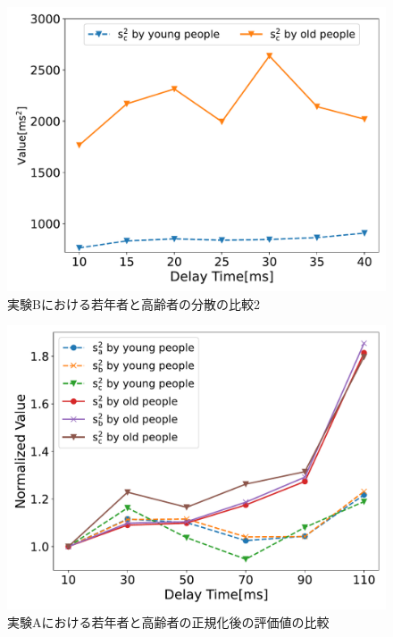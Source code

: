 \begin{figure}[tbp]
  \centering
  \includegraphics[scale=0.5]{figures/Honbann/Comparison_young_old/40_var_Sc.pdf}
  \caption{実験Bにおける若年者と高齢者の分散の比較2}
  \label{fig:Var_40ms_Sc}
\end{figure}

\begin{figure}[tbp]
  \centering
  \includegraphics[scale=0.5]{figures/Honbann/Comparison_young_old/110_var_normalized.pdf}
  \caption{実験Aにおける若年者と高齢者の正規化後の評価値の比較}
  \label{fig:Normalized-Var_110ms_SaSbSc}
\end{figure}

